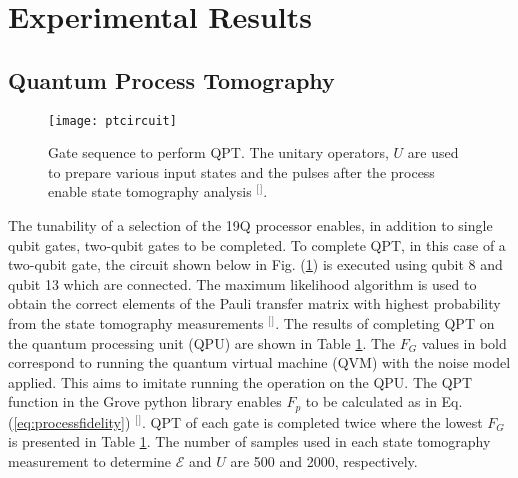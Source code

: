\section{\label{sec:level1}Experimental Results}
\subsection{Quantum Process Tomography}

\begin{figure}[b]
\centering
\texttt{[image: ptcircuit]}
\caption{\label{fig:ptcircuit}Gate sequence to perform QPT. The unitary operators, $U$ are used to prepare various input states and the pulses after the process enable state tomography analysis $^{[}$\citep{Chow2012UniversalQubits}$^{]}$.}
\end{figure}


The tunability of a selection of the 19Q processor enables, in addition to single qubit gates, two-qubit gates to be completed. To complete QPT, in this case of a two-qubit gate, the circuit shown below in Fig. (\ref{fig:ptcircuit}) is executed using qubit 8 and qubit 13 which are connected. The maximum likelihood algorithm is used to obtain the correct elements of the Pauli transfer matrix with highest probability from the state tomography measurements $^{[}$\citep{Smolin2012EfficientNoise}$^{]}$. The results of completing QPT on the quantum processing unit (QPU) are shown in Table \ref{fig:ptcircuit}. The $F_{G}$ values in bold correspond to running the quantum virtual machine (QVM) with the noise model applied. This aims to imitate running the operation on the QPU. The QPT function in the Grove python library enables $F_{p}$ to be calculated as in Eq. (\ref{eq:processfidelity}) $^{[}$\citep{Smith2016AArchitecture}$^{]}$. QPT of each gate is completed twice where the lowest $F_{G}$ is presented in Table \ref{fig:ptcircuit}. The number of samples used in each state tomography measurement to determine $\mathcal{E}$ and $U$ are 500 and 2000, respectively.   



